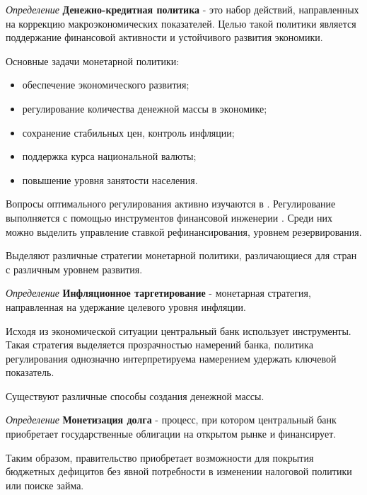 
\textit{Определение} \textbf{Денежно-кредитная политика } - это набор действий, направленных на коррекцию макроэкономических показателей. Целью такой политики является поддержание финансовой активности и устойчивого развития экономики.

Основные задачи монетарной политики:
\begin{itemize}
    \item обеспечение экономического развития;
    \item регулирование количества денежной массы в экономике;
    \item сохранение стабильных цен, контроль инфляции;
    \item поддержка курса национальной валюты;
    \item повышение уровня занятости населения.
\end{itemize}

Вопросы оптимального регулирования активно изучаются в \cite{нэш2008идеальные}.
Регулирование выполняется с помощью инструментов финансовой инженерии \cite{архипов2007предпосылки}. Среди них можно выделить управление ставкой рефинансирования, уровнем резервирования. 



Выделяют различные стратегии монетарной политики, различающиеся для стран с различным уровнем развития.

\textit{Определение} \textbf{Инфляционное таргетирование} \cite{bernanke1997inflation} - монетарная стратегия, направленная на удержание целевого уровня инфляции. 

Исходя из экономической ситуации центральный банк использует инструменты. Такая стратегия выделяется прозрачностью намерений банка, политика регулирования однозначно интерпретируема намерением удержать ключевой показатель.

Существуют различные способы создания денежной массы.

\textit{Определение} \textbf{Монетизация долга} - процесс, при котором центральный банк приобретает государственные облигации на открытом рынке и финансирует. 

Таким образом, правительство приобретает возможности для покрытия бюджетных дефицитов без явной потребности в изменении налоговой политики или поиске займа.

